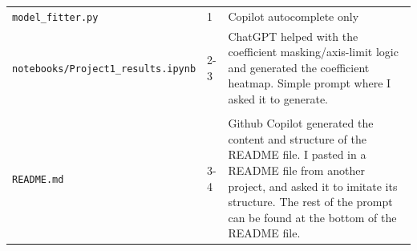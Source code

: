 \documentclass[amssymb,twocolumn,aps]{revtex4}
\begin{document}
\begin{tabular}{llp{7cm}}
    \texttt{model\_fitter.py}                  & 1     & Copilot autocomplete only                                                                                                                                                                                                            \\
    \texttt{notebooks/Project1\_results.ipynb} & 2-3   & ChatGPT helped with the coefficient masking/axis-limit logic and generated the coefficient heatmap. Simple prompt where I asked it to generate.                                                                                      \\
    \\
    \texttt{README.md}                         & 3-4   & Github Copilot generated the content and structure of the README file.  I pasted in a README file from another project, and asked it to imitate its structure. The rest of the prompt can be found at the bottom of the README file. \\
\end{tabular}
\end{document}
